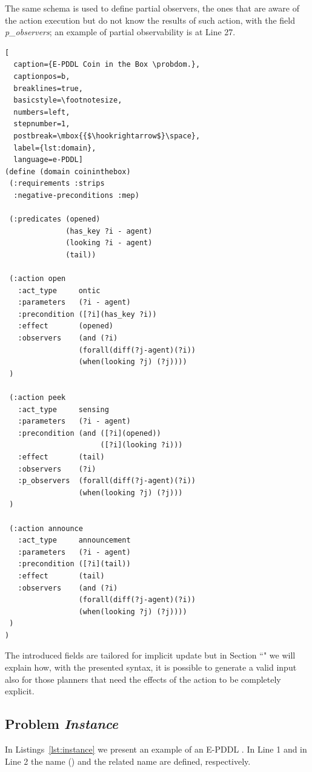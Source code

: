 The same schema is used to define partial observers, the ones that are aware of the action execution but do not know the results of such action, with the field \emph{p\_observers}; an example of partial observability is at Line 27.
\begin{lstlisting}[
  caption={E-PDDL Coin in the Box \probdom.},
  captionpos=b,
  breaklines=true,
  basicstyle=\footnotesize,
  numbers=left,
  stepnumber=1,
  postbreak=\mbox{{$\hookrightarrow$}\space},
  label={lst:domain},
  language=e-PDDL]
(define (domain coininthebox)
 (:requirements :strips 
  :negative-preconditions :mep)
  
 (:predicates (opened)
              (has_key ?i - agent)
              (looking ?i - agent)
              (tail))
 
 (:action open
   :act_type     ontic
   :parameters   (?i - agent)
   :precondition ([?i](has_key ?i))
   :effect       (opened)
   :observers    (and (?i)
                 (forall(diff(?j-agent)(?i))
                 (when(looking ?j) (?j))))
 )

 (:action peek
   :act_type	 sensing
   :parameters   (?i - agent)
   :precondition (and ([?i](opened))
                      ([?i](looking ?i)))
   :effect       (tail)
   :observers	 (?i)
   :p_observers  (forall(diff(?j-agent)(?i))
                 (when(looking ?j) (?j)))
 )

 (:action announce
   :act_type	 announcement
   :parameters   (?i - agent)
   :precondition ([?i](tail))
   :effect       (tail)
   :observers    (and (?i)
                 (forall(diff(?j-agent)(?i))
                 (when(looking ?j) (?j))))
 )
)
\end{lstlisting}
The introduced fields are tailored for implicit \knobel update but in Section ``\textbf{\impltoexpl}" we will explain how, with the presented syntax, it is possible to generate a valid input also for those planners that need the effects of the action to be completely explicit.

\subsection{Problem \emph{Instance}}
In Listings~\ref{lst:instance} we present an example of an E-PDDL \probinst.
In Line 1 and in Line 2 the \probinst name (\ie {}) and the related \probdom name are defined, respectively.

